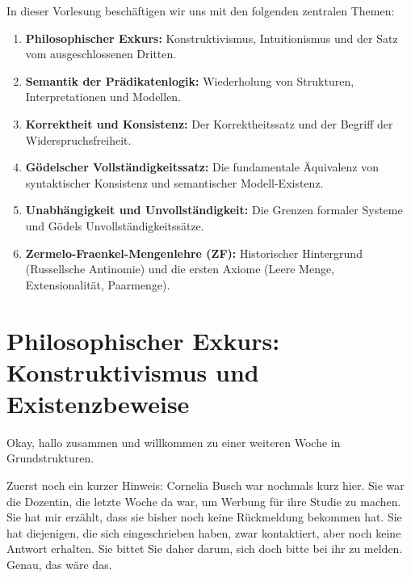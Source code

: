 

\begin{nice-box}
In dieser Vorlesung beschäftigen wir uns mit den folgenden zentralen Themen:
\begin{enumerate}[label=\textbf{\arabic*.}]
    \item \textbf{Philosophischer Exkurs:} Konstruktivismus, Intuitionismus und der Satz vom ausgeschlossenen Dritten.
    \item \textbf{Semantik der Prädikatenlogik:} Wiederholung von Strukturen, Interpretationen und Modellen.
    \item \textbf{Korrektheit und Konsistenz:} Der Korrektheitssatz und der Begriff der Widerspruchsfreiheit.
    \item \textbf{Gödelscher Vollständigkeitssatz:} Die fundamentale Äquivalenz von syntaktischer Konsistenz und semantischer Modell-Existenz.
    \item \textbf{Unabhängigkeit und Unvollständigkeit:} Die Grenzen formaler Systeme und Gödels Unvollständigkeitssätze.
    \item \textbf{Zermelo-Fraenkel-Mengenlehre (ZF):} Historischer Hintergrund (Russellsche Antinomie) und die ersten Axiome (Leere Menge, Extensionalität, Paarmenge).
\end{enumerate}
\end{nice-box}

\section{Philosophischer Exkurs: Konstruktivismus und Existenzbeweise}

\begin{spoken-clean}[00:00:00 - 00:00:39]
Okay, hallo zusammen und willkommen zu einer weiteren Woche in Grundstrukturen.

Zuerst noch ein kurzer Hinweis: Cornelia Busch war nochmals kurz hier. Sie war die Dozentin, die letzte Woche da war, um Werbung für ihre Studie zu machen. Sie hat mir erzählt, dass sie bisher noch keine Rückmeldung bekommen hat. Sie hat diejenigen, die sich eingeschrieben haben, zwar kontaktiert, aber noch keine Antwort erhalten. Sie bittet Sie daher darum, sich doch bitte bei ihr zu melden. Genau, das wäre das.
\end{spoken-clean}

